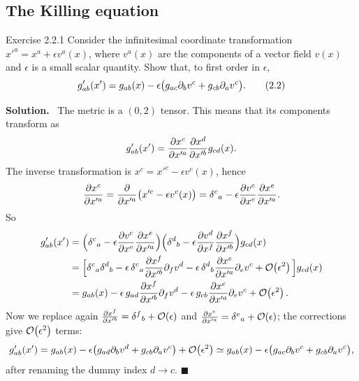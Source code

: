 \documentclass[11pt,a4paper]{article}
\numberwithin{equation}{subsection}
\newenvironment{solution}{\par\noindent\textbf{\textcolor{excol!70!black}{Solution.}}\ }{\hfill$\blacksquare$\par\medskip}
\begin{document}
\subsection{The Killing equation}
\begin{problem}{Exercise 2.2.1}
Consider the infinitesimal coordinate transformation $x'^a=x^a+\epsilon v^a(x)$, where $v^a(x)$ are the components of a vector field $v(x)$ and $\epsilon$ is a small scalar quantity. Show that, to first order in $\epsilon$,
\[
  g'_{ab}(x')=g_{ab}(x)-\epsilon\big(g_{ac}\partial_bv^c+g_{cb}\partial_av^c\big). \tag{2.2}
\]
\end{problem}
\begin{solution}
The metric is a $(0,2)$ tensor. This means that its components transform as
\[
  g'_{ab}(x')=\frac{\partial x^c}{\partial x'^a}\frac{\partial x^d}{\partial x'^b}g_{cd}(x).
\]
The inverse transformation is $x^c=x'^c-\epsilon v^c(x)$, hence
\[
  \frac{\partial x^c}{\partial x'^a}=\frac{\partial}{\partial x'^a}\big(x'^c-\epsilon v^c(x)\big)=\delta^c{}_a-\epsilon\frac{\partial v^c}{\partial x^e}\frac{\partial x^e}{\partial x'^a}.
\]
So
\begin{align*}
  g'_{ab}(x')&=\Big(\delta^c{}_a-\epsilon\frac{\partial v^c}{\partial x^e}\frac{\partial x^e}{\partial x'^a}\Big)\Big(\delta^d{}_b-\epsilon\frac{\partial v^d}{\partial x^f}\frac{\partial x^f}{\partial x'^b}\Big)g_{cd}(x)\\
  &=\Big[\delta^c{}_a\delta^d{}_b-\epsilon\,\delta^c{}_a\frac{\partial x^f}{\partial x'^b}\partial_fv^d-\epsilon\,\delta^d{}_b\frac{\partial x^e}{\partial x'^a}\partial_ev^c+\mathcal{O}\!\left(\epsilon^2\right)\Big]g_{cd}(x)\\
  &=g_{ab}(x)-\epsilon\,g_{ad}\frac{\partial x^f}{\partial x'^b}\partial_fv^d-\epsilon\,g_{cb}\frac{\partial x^e}{\partial x'^a}\partial_ev^c+\mathcal{O}\!\left(\epsilon^2\right).
\end{align*}
Now we replace again $\frac{\partial x^f}{\partial x'^b}=\delta^f{}_b+\mathcal{O}\!\left(\epsilon\right)$ and $\frac{\partial x^e}{\partial x'^a}=\delta^e{}_a+\mathcal{O}\!\left(\epsilon\right)$; the corrections give $\mathcal{O}\!\left(\epsilon^2\right)$ terms:
\[
  g'_{ab}(x')=g_{ab}(x)-\epsilon\big(g_{ad}\partial_bv^d+g_{cb}\partial_av^c\big)+\mathcal{O}\!\left(\epsilon^2\right)\simeq g_{ab}(x)-\epsilon\big(g_{ac}\partial_bv^c+g_{cb}\partial_av^c\big),
\]
after renaming the dummy index $d\to c$.
\end{solution}
\end{document}
